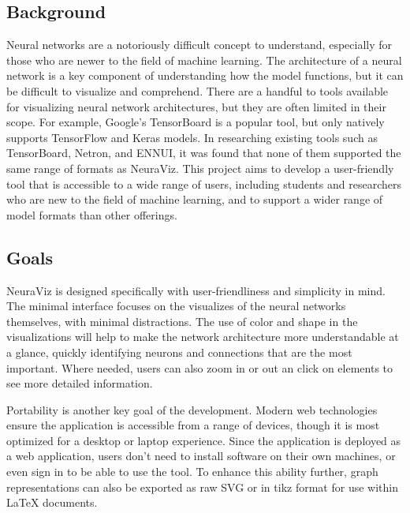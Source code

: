\subsection{Background}
Neural networks are a notoriously difficult concept to understand, especially for those who are newer to the field of machine learning. The architecture of a neural network is a key component of understanding how the model functions, but it can be difficult to visualize and comprehend. There are a handful to tools available for visualizing neural network architectures, but they are often limited in their scope. For example, Google's TensorBoard is a popular tool, but only natively supports TensorFlow and Keras models. In researching existing tools such as TensorBoard, Netron, and ENNUI, it was found that none of them supported the same range of formats as NeuraViz. This project aims to develop a user-friendly tool that is accessible to a wide range of users, including students and researchers who are new to the field of machine learning, and to support a wider range of model formats than other offerings.

\subsection{Goals}
NeuraViz is designed specifically with user-friendliness and simplicity in mind. The minimal interface focuses on the visualizes of the neural networks themselves, with minimal distractions. The use of color and shape in the visualizations will help to make the network architecture more understandable at a glance, quickly identifying neurons and connections that are the most important. Where needed, users can also zoom in or out an click on elements to see more detailed information.

Portability is another key goal of the development. Modern web technologies ensure the application is accessible from a range of devices, though it is most optimized for a desktop or laptop experience. Since the application is deployed as a web application, users don't need to install software on their own machines, or even sign in to be able to use the tool. To enhance this ability further, graph representations can also be exported as raw SVG or in tikz format for use within LaTeX documents. 
